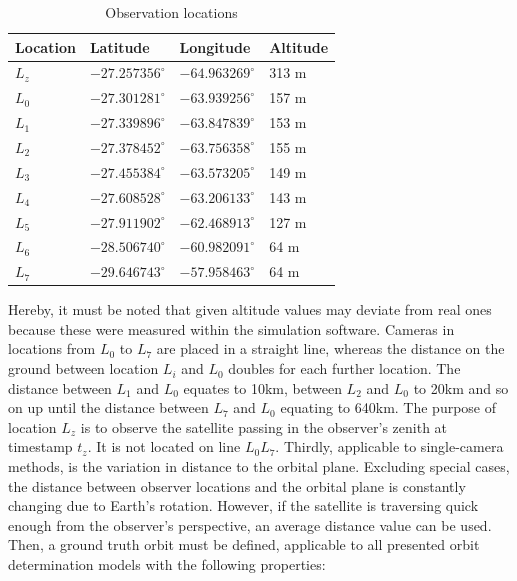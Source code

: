 \documentclass[10pt,a4paper]{article}
\begin{document}
	
	\begin{table}[htbp]
		\centering
		\caption{Observation locations}
		\label{tab:observation_locations}
		\begin{tabular}{llll}
			\toprule
			Location & Latitude & Longitude & Altitude \\
			\midrule
			$L_z$ & $-27.257356^\circ$ & $-64.963269^\circ$ & 313 m \\
			$L_0$ & $-27.301281^\circ$ & $-63.939256^\circ$ & 157 m \\
			$L_1$ & $-27.339896^\circ$ & $-63.847839^\circ$ & 153 m \\
			$L_2$ & $-27.378452^\circ$ & $-63.756358^\circ$ & 155 m \\
			$L_3$ & $-27.455384^\circ$ & $-63.573205^\circ$ & 149 m \\
			$L_4$ & $-27.608528^\circ$ & $-63.206133^\circ$ & 143 m \\
			$L_5$ & $-27.911902^\circ$ & $-62.468913^\circ$ & 127 m \\
			$L_6$ & $-28.506740^\circ$ & $-60.982091^\circ$ & 64 m \\
			$L_7$ & $-29.646743^\circ$ & $-57.958463^\circ$ & 64 m \\
			\bottomrule
		\end{tabular}
	\end{table}
	\noindent
	Hereby, it must be noted that given altitude values may deviate from real ones because these were measured within the simulation software. Cameras in locations from $L_0$ to $L_7$ are placed in a straight line, whereas the distance on the ground between location $L_i$ and $L_0$ doubles for each further location. The distance between $L_1$ and $L_0$ equates to 10km, between $L_2$ and $L_0$ to 20km and so on up until the distance between $L_7$ and $L_0$ equating to 640km. The purpose of location $L_z$ is to observe the satellite passing in the observer's zenith at timestamp $t_z$. It is not located on line $L_0L_7$.\newline
	Thirdly, applicable to single-camera methods, is the variation in distance to the orbital plane. Excluding special cases, the distance between observer locations and the orbital plane is constantly changing due to Earth's rotation. However, if the satellite is traversing quick enough from the observer's perspective, an average distance value can be used.
	Then, a ground truth orbit must be defined, applicable to all presented orbit determination models with the following properties:
	
\end{document}
